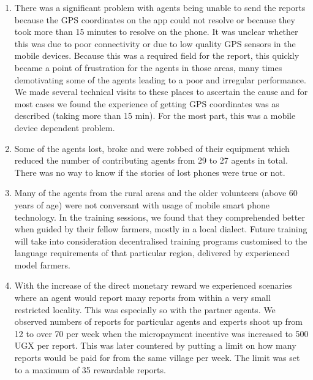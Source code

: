 \documentclass[letterpaper]{article} %
\begin{document}
\begin{enumerate}
\item There was a significant problem with agents being unable to send the reports because the GPS coordinates on the app could not resolve or because they took more than 15 minutes to resolve on the phone. It was unclear whether this was due to poor connectivity or due to low quality GPS sensors in the mobile devices. Because this was a required field for the report, this quickly became a point of frustration for the agents in those areas, many times demotivating some of the agents leading to a poor and irregular performance. We made several technical visits to these places to ascertain the cause and for most cases we found the experience of getting GPS coordinates was as described (taking more than 15 min). For the most part, this was a mobile device dependent problem.
\item Some of the agents lost, broke and were robbed of their equipment which reduced the number of contributing agents from 29 to 27 agents in total. There was no way to know if the stories of lost phones were true or not.
\item Many of the agents from the rural areas and the older volunteers (above 60 years of age) were not conversant with usage of mobile smart phone technology. In the training sessions, we found that they comprehended better when guided by their fellow farmers, mostly in a local dialect.
Future training will take into consideration decentralised training programs customised to the language requirements of that particular region, delivered by experienced model farmers.
\item With the increase of the direct monetary reward we experienced scenaries where an agent would report many reports from within a very small restricted locality. This was especially so with the partner agents. We observed numbers of reports for particular agents and experts shoot up from 12 to over 70 per week when the micropayment incentive was increased to 500 UGX per report. This was later countered by putting a limit on how many reports would be paid for from the same village per week. The limit was set to a maximum of 35 rewardable reports.
\end{enumerate}
\end{document}
